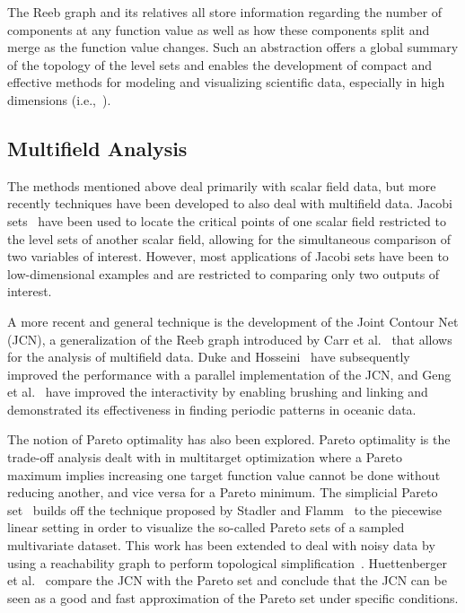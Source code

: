 
The Reeb graph and its relatives all store information regarding the number of components at any function value as well as how these components split and merge as the function value changes.
%
Such an abstraction offers a global summary of the topology of the level sets and enables the development of compact and effective methods for modeling and visualizing scientific data, especially in high dimensions (i.e.,~\cite{SinghMemoliCarlsson2007,NicolauLevineCarlsson2011}).

\subsection{Multifield Analysis}

The methods mentioned above deal primarily with scalar field data, but more recently techniques have been developed to also deal with multifield data.
%
Jacobi sets~\cite{EdelsbrunnerHarer2002} have been used to locate the critical points of one scalar field restricted to the level sets of another scalar field, allowing for the simultaneous comparison of two variables of interest.
%
However, most applications of Jacobi sets have been to low-dimensional examples and are restricted to comparing only two outputs of interest.

A more recent and general technique is the development of the Joint Contour Net (JCN), a generalization of the Reeb graph introduced by Carr et al.~\cite{CarrDuke2014,DukeCarrKnoll2012} that allows for the analysis of multifield data.
%
Duke and Hosseini~\cite{DukeHosseini2015} have subsequently improved the performance with a parallel implementation of the JCN, and Geng et al.~\cite{GengDukeCarr2015} have improved the interactivity by enabling brushing and linking and demonstrated its effectiveness in finding periodic patterns in oceanic data.

The notion of Pareto optimality has also been explored.
%
Pareto optimality is the trade-off analysis dealt with in multitarget optimization where a Pareto maximum implies increasing one target function value cannot be done without reducing another, and vice versa for a Pareto minimum.
%
The simplicial Pareto set~\cite{HuettenbergerHeineCarr2013} builds off the technique proposed by Stadler and Flamm~\cite{StadlerFlamm2003} to the piecewise linear setting in order to visualize the so-called Pareto sets of a sampled multivariate dataset.
%
This work has been extended to deal with noisy data by using a reachability graph to perform topological simplification~\cite{HuettenbergerHeineGarth2014}.
%
Huettenberger et al.~\cite{HuettenbergerHeineGarth2015} compare the JCN with the Pareto set and conclude that the JCN can be seen as a good and fast approximation of the Pareto set under specific conditions.

